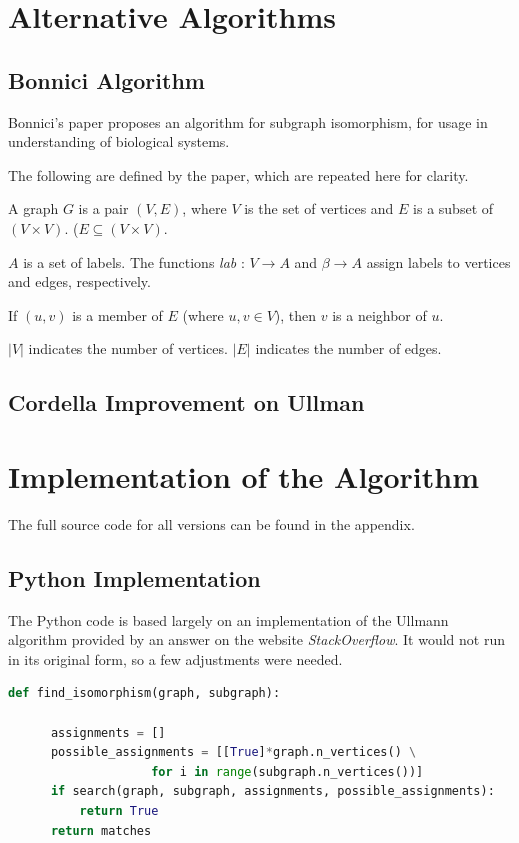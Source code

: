 \documentclass{article}
\begin{document}
\section{Alternative Algorithms}

  \subsection{Bonnici Algorithm}

  Bonnici's paper proposes an algorithm for subgraph isomorphism, for usage in understanding of biological systems.

  The following are defined by the paper, which are repeated here for clarity.

  A graph $G$ is a pair $(V, E)$, where $V$ is the set of vertices and $E$ is a subset of $(V \times V)$. ($E \subseteq (V \times V)$.

  $A$ is a set of labels.  The functions \textit{lab} : $V \to A$ and $\beta \to A$ assign labels to vertices and edges, respectively.

  If $(u, v)$ is a member of $E$ (where $u, v \in V$), then $v$ is a neighbor of $u$.

  $|V|$ indicates the number of vertices.
  $|E|$ indicates the number of edges.

  
  \subsection{Cordella Improvement on Ullman}

\section{Implementation of the Algorithm}

The full source code for all versions can be found in the appendix.

  \subsection{Python Implementation}
  The Python code is based largely on an implementation of the Ullmann algorithm provided by an answer on the website \textit{StackOverflow}.\cite{pyiso} It would not run in its original form, so a few adjustments were needed.

  \begin{lstlisting}[language=Python,caption={Function used to determine whether an isomorphism exists.}]
  def find_isomorphism(graph, subgraph):

      assignments = []
      possible_assignments = [[True]*graph.n_vertices() \
                    for i in range(subgraph.n_vertices())]
      if search(graph, subgraph, assignments, possible_assignments):
          return True
      return matches
  \end{lstlisting}
\end{document}

